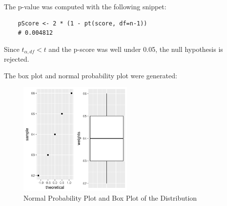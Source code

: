     The p-value was computed with the following snippet:
\begin{lstlisting}
    pScore <- 2 * (1 - pt(score, df=n-1))
    # 0.004812
\end{lstlisting}

    Since $t_{\alpha, df} < t$ and the p-score was well under 0.05, the null hypothesis is rejected.

    \clearpage

    The box plot and normal probability plot were generated:

        \begin{figure}[ht]
            \begin{center}
                \includegraphics[width=0.5\textwidth]{figures/part3.png}
                \caption{Normal Probability Plot and Box Plot of the Distribution} \label{fig:part3}
            \end{center}
        \end{figure}
